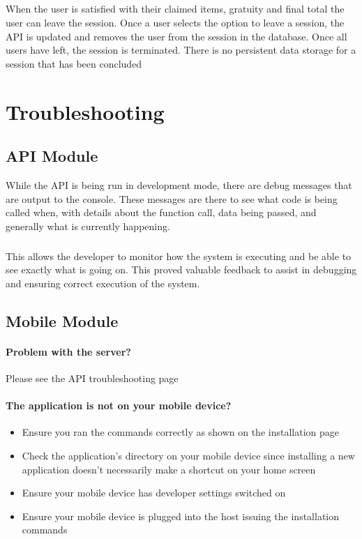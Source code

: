 \documentclass[12pt,a4paper]{article}
\begin{document}
\subparagraph{}
When the user is satisfied with their claimed items, gratuity and final total the user can leave the session. Once a user selects the option to leave a session, the API is updated and removes the user from the session in the database. Once all users have left, the session is terminated. There is no persistent data storage for a session that has been concluded


\section{Troubleshooting}	
   \subsection{API Module}
While the API is being run in development mode, there are debug messages that are output to the console. These messages are there to see what code is being called when, with details about the function call, data being passed, and generally what is currently happening.
\subparagraph{}
This allows the developer to monitor how the system is executing and be able to see exactly what is going on. This proved valuable feedback to assist in debugging and ensuring correct execution of the system.
	
    \subsection{Mobile Module}
 	\paragraph{Problem with the server?}
		Please see the API troubleshooting page
\paragraph{The application is not on your mobile device?}
\begin{itemize}
\item Ensure you ran the commands correctly as shown on the installation page
\item Check the application's directory on your mobile device since installing a new application doesn't necessarily make a shortcut on your home screen
\item Ensure your mobile device has developer settings switched on
\item Ensure your mobile device is plugged into the host issuing the installation commands
\end{itemize} 
\end{document}
